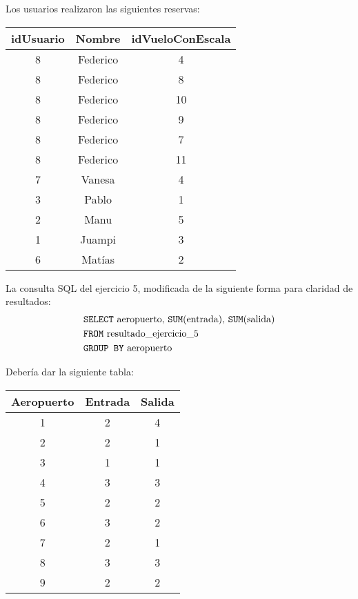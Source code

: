 Los usuarios realizaron las siguientes reservas:
\begin{center}
	\begin{tabular}{ c | c | c }
	\textbf{idUsuario} & \textbf{Nombre} & \textbf{idVueloConEscala} \\ \hline
		8 & Federico & 4 \\
		8 & Federico & 8 \\
		8 & Federico & 10 \\
		8 & Federico & 9 \\
		8 & Federico & 7 \\
		8 & Federico & 11 \\
		7 & Vanesa & 4 \\
		3 & Pablo & 1 \\
		2 & Manu & 5 \\
		1 & Juampi & 3 \\
		6 & Matías & 2 \\
	\end{tabular}
\end{center}

La consulta SQL del ejercicio 5, modificada de la siguiente forma para claridad de resultados:
\begin{align*}
	& \text{\texttt{SELECT} aeropuerto, \texttt{SUM}(entrada), \texttt{SUM}(salida)} \\
	& \text{\texttt{FROM} resultado\_ejercicio\_5} \\
	& \text{\texttt{GROUP BY} aeropuerto} \\
\end{align*}

Debería dar la siguiente tabla:
\begin{center}
	\begin{tabular}{ c | c | c}
		\textbf{Aeropuerto} & \textbf{Entrada} & \textbf{Salida} \\ \hline
		1 & 2 & 4 \\
		2 & 2 & 1 \\
		3 & 1 & 1 \\
		4 & 3 & 3 \\
		5 & 2 & 2 \\
		6 & 3 & 2 \\
		7 & 2 & 1 \\
		8 & 3 & 3 \\
		9 & 2 & 2 \\
	\end{tabular}
\end{center}


